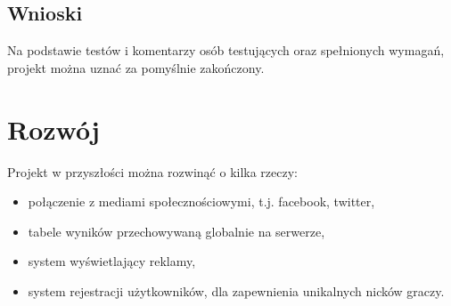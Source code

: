 \documentclass[a4paper, 11pt]{article}
\begin{document}
\subsection{Wnioski}
Na podstawie testów i komentarzy osób testujących oraz spełnionych wymagań, projekt można uznać za pomyślnie zakończony.


\vfill
\newpage
\section{Rozwój}
Projekt w przyszłości można rozwinąć o kilka rzeczy:
\begin{itemize}
\item połączenie z mediami społecznościowymi, t.j. facebook, twitter,
\item tabele wyników przechowywaną globalnie na serwerze,
\item system wyświetlający reklamy,
\item system rejestracji użytkowników, dla zapewnienia unikalnych nicków graczy.
\end{itemize}

	
\end{document}
